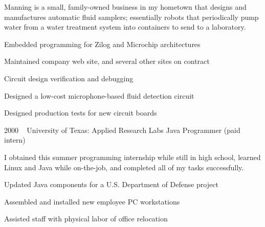 \documentclass[]{SBResume}
\begin{document}
\begin{resume}
{          Manning is a small, family-owned business in my hometown that
          designs and manufactures automatic fluid samplers; essentially
          robots that periodically pump water from a water treatment
          system into containers to send to a laboratory.\\
          
          \begin{resumeitemize}
          \item{Embedded programming for Zilog and Microchip architectures}
          \item{Maintained company web site, and several other sites on contract}
          \item{Circuit design verification and debugging}
          \item{Designed a low-cost microphone-based fluid detection circuit}
          \item{Designed production tests for new circuit boards}
          \end{resumeitemize}
        }
    \resumeentry
        {2000}
        {\ }
        {University of Texas: Applied Research Labs}
        {Java Programmer (paid intern)}
        {
          
          I obtained this summer programming internship while still in
          high school, learned Linux and Java while on-the-job, and
          completed all of my tasks successfully.\\
          
          \begin{resumeitemize}
          \item{Updated Java components for a U.S. Department of Defense project}
          \item{Assembled and installed new employee PC workstations}
          \item{Assisted staff with physical labor of office relocation}
          \end{resumeitemize}
        }
    \fi
\end{resume}
\end{document}
